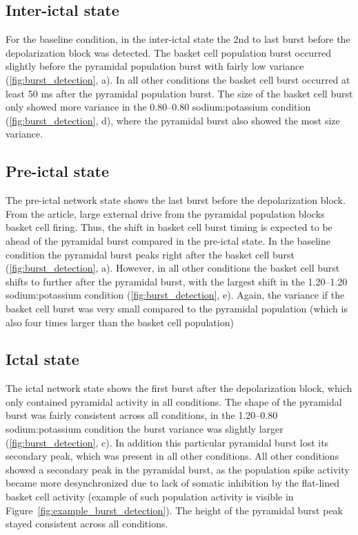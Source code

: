\subsection{Inter-ictal state}
For the baseline condition, in the inter-ictal state the 2nd to last burst before the depolarization block was detected.
The basket cell population burst occurred slightly before the pyramidal population burst with fairly low variance (\ref{fig:burst_detection}, a).
In all other conditions the basket cell burst occurred at least 50 ms after the pyramidal population burst.
The size of the basket cell burst only showed more variance in the 0.80--0.80 sodium:potassium condition (\ref{fig:burst_detection}, d), where the pyramidal burst also showed the most size variance.

\subsection{Pre-ictal state}
The pre-ictal network state shows the last burst before the depolarization block.
From the \textcite{sanjayImpairedDendriticInhibition2015} article, large external drive from the pyramidal population blocks basket cell firing.
Thus, the shift in basket cell burst timing is expected to be ahead of the pyramidal burst compared in the pre-ictal state.
In the baseline condition the pyramidal burst peaks right after the basket cell burst (\ref{fig:burst_detection}, a).
However, in all other conditions the basket cell burst shifts to further after the pyramidal burst, with the largest shift in the 1.20--1.20 sodium:potassium condition (\ref{fig:burst_detection}, e).
Again, the variance if the basket cell burst was very small compared to the pyramidal population (which is also four times larger than the basket cell population)

\subsection{Ictal state}
The ictal network state shows the first burst after the depolarization block, which only contained pyramidal activity in all conditions.
The shape of the pyramidal burst was fairly consistent across all conditions, in the 1.20--0.80 sodium:potassium condition the burst variance was slightly larger (\ref{fig:burst_detection}, c).
In addition this particular pyramidal burst lost its secondary peak, which was present in all other conditions.
All other conditions showed a secondary peak in the pyramidal burst, as the population spike activity became more desynchronized due to lack of somatic inhibition by the flat-lined basket cell activity (example of such population activity is visible in Figure~\ref{fig:example_burst_detection}).
The height of the pyramidal burst peak stayed consistent across all conditions.

